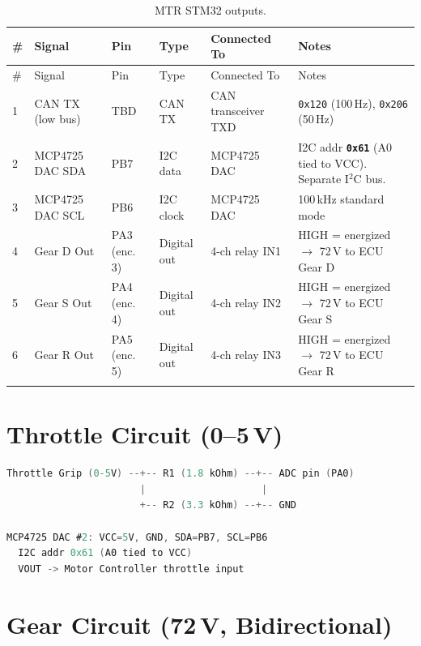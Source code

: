 \documentclass[12pt,a4paper,oneside]{report}
\newcommand{\canid}[1]{\texttt{0x#1}}
\newcommand{\iicaddr}[1]{\texttt{0x#1}}
\begin{document}
\begin{center}
\begin{longtable}{p{4mm} p{28mm} p{26mm} p{18mm} p{36mm} p{38mm}}
\toprule
\# & Signal & Pin & Type & Connected To & Notes \\
\midrule
\endfirsthead
\toprule
\# & Signal & Pin & Type & Connected To & Notes \\
\midrule
\endhead
1 & CAN TX (low bus)   & TBD   & CAN TX    & CAN transceiver TXD & \canid{120} (100\,Hz), \canid{206} (50\,Hz) \\
2 & MCP4725 DAC SDA    & PB7   & I2C data  & MCP4725 DAC & I2C addr \textbf{\iicaddr{61}} (A0 tied to VCC). Separate I$^2$C bus. \\
3 & MCP4725 DAC SCL    & PB6   & I2C clock & MCP4725 DAC & 100\,kHz standard mode \\
4 & Gear D Out         & PA3 (enc. 3)  & Digital out & 4-ch relay IN1 & HIGH = energized $\rightarrow$ 72\,V to ECU Gear D \\
5 & Gear S Out         & PA4 (enc. 4)  & Digital out & 4-ch relay IN2 & HIGH = energized $\rightarrow$ 72\,V to ECU Gear S \\
6 & Gear R Out         & PA5 (enc. 5)  & Digital out & 4-ch relay IN3 & HIGH = energized $\rightarrow$ 72\,V to ECU Gear R \\
\bottomrule
\caption{MTR STM32 outputs.}
\end{longtable}
\end{center}

\section{Throttle Circuit (0--5\,V)}

\begin{lstlisting}[language=C, caption={MTR throttle DAC circuit. SYS at \iicaddr{60}, MTR at \iicaddr{61} (A0 tied to VCC).}]
Throttle Grip (0-5V) --+-- R1 (1.8 kOhm) --+-- ADC pin (PA0)
                       |                    |
                       +-- R2 (3.3 kOhm) --+-- GND

MCP4725 DAC #2: VCC=5V, GND, SDA=PB7, SCL=PB6
  I2C addr 0x61 (A0 tied to VCC)
  VOUT -> Motor Controller throttle input
\end{lstlisting}

\section{Gear Circuit (72\,V, Bidirectional)}
\end{document}
